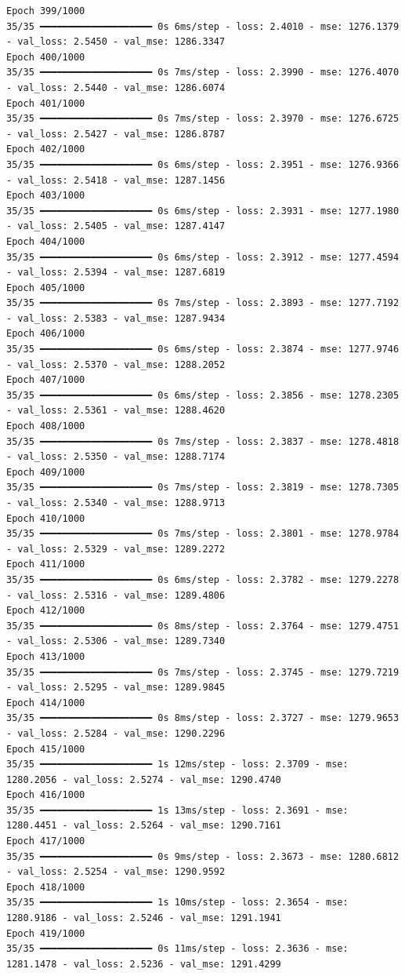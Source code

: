 \documentclass[
  letterpaper,
  DIV=11,
  numbers=noendperiod]{scrreprt}
\begin{document}
\begin{verbatim}
Epoch 399/1000
35/35 ━━━━━━━━━━━━━━━━━━━━ 0s 6ms/step - loss: 2.4010 - mse: 1276.1379 - val_loss: 2.5450 - val_mse: 1286.3347
Epoch 400/1000
35/35 ━━━━━━━━━━━━━━━━━━━━ 0s 7ms/step - loss: 2.3990 - mse: 1276.4070 - val_loss: 2.5440 - val_mse: 1286.6074
Epoch 401/1000
35/35 ━━━━━━━━━━━━━━━━━━━━ 0s 7ms/step - loss: 2.3970 - mse: 1276.6725 - val_loss: 2.5427 - val_mse: 1286.8787
Epoch 402/1000
35/35 ━━━━━━━━━━━━━━━━━━━━ 0s 6ms/step - loss: 2.3951 - mse: 1276.9366 - val_loss: 2.5418 - val_mse: 1287.1456
Epoch 403/1000
35/35 ━━━━━━━━━━━━━━━━━━━━ 0s 6ms/step - loss: 2.3931 - mse: 1277.1980 - val_loss: 2.5405 - val_mse: 1287.4147
Epoch 404/1000
35/35 ━━━━━━━━━━━━━━━━━━━━ 0s 6ms/step - loss: 2.3912 - mse: 1277.4594 - val_loss: 2.5394 - val_mse: 1287.6819
Epoch 405/1000
35/35 ━━━━━━━━━━━━━━━━━━━━ 0s 7ms/step - loss: 2.3893 - mse: 1277.7192 - val_loss: 2.5383 - val_mse: 1287.9434
Epoch 406/1000
35/35 ━━━━━━━━━━━━━━━━━━━━ 0s 6ms/step - loss: 2.3874 - mse: 1277.9746 - val_loss: 2.5370 - val_mse: 1288.2052
Epoch 407/1000
35/35 ━━━━━━━━━━━━━━━━━━━━ 0s 6ms/step - loss: 2.3856 - mse: 1278.2305 - val_loss: 2.5361 - val_mse: 1288.4620
Epoch 408/1000
35/35 ━━━━━━━━━━━━━━━━━━━━ 0s 7ms/step - loss: 2.3837 - mse: 1278.4818 - val_loss: 2.5350 - val_mse: 1288.7174
Epoch 409/1000
35/35 ━━━━━━━━━━━━━━━━━━━━ 0s 7ms/step - loss: 2.3819 - mse: 1278.7305 - val_loss: 2.5340 - val_mse: 1288.9713
Epoch 410/1000
35/35 ━━━━━━━━━━━━━━━━━━━━ 0s 7ms/step - loss: 2.3801 - mse: 1278.9784 - val_loss: 2.5329 - val_mse: 1289.2272
Epoch 411/1000
35/35 ━━━━━━━━━━━━━━━━━━━━ 0s 6ms/step - loss: 2.3782 - mse: 1279.2278 - val_loss: 2.5316 - val_mse: 1289.4806
Epoch 412/1000
35/35 ━━━━━━━━━━━━━━━━━━━━ 0s 8ms/step - loss: 2.3764 - mse: 1279.4751 - val_loss: 2.5306 - val_mse: 1289.7340
Epoch 413/1000
35/35 ━━━━━━━━━━━━━━━━━━━━ 0s 7ms/step - loss: 2.3745 - mse: 1279.7219 - val_loss: 2.5295 - val_mse: 1289.9845
Epoch 414/1000
35/35 ━━━━━━━━━━━━━━━━━━━━ 0s 8ms/step - loss: 2.3727 - mse: 1279.9653 - val_loss: 2.5284 - val_mse: 1290.2296
Epoch 415/1000
35/35 ━━━━━━━━━━━━━━━━━━━━ 1s 12ms/step - loss: 2.3709 - mse: 1280.2056 - val_loss: 2.5274 - val_mse: 1290.4740
Epoch 416/1000
35/35 ━━━━━━━━━━━━━━━━━━━━ 1s 13ms/step - loss: 2.3691 - mse: 1280.4451 - val_loss: 2.5264 - val_mse: 1290.7161
Epoch 417/1000
35/35 ━━━━━━━━━━━━━━━━━━━━ 0s 9ms/step - loss: 2.3673 - mse: 1280.6812 - val_loss: 2.5254 - val_mse: 1290.9592
Epoch 418/1000
35/35 ━━━━━━━━━━━━━━━━━━━━ 1s 10ms/step - loss: 2.3654 - mse: 1280.9186 - val_loss: 2.5246 - val_mse: 1291.1941
Epoch 419/1000
35/35 ━━━━━━━━━━━━━━━━━━━━ 0s 11ms/step - loss: 2.3636 - mse: 1281.1478 - val_loss: 2.5236 - val_mse: 1291.4299

\end{verbatim}
\end{document}
